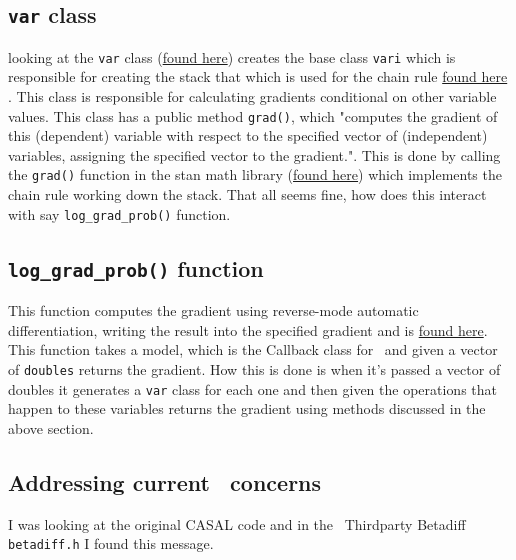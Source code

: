 \subsection{\texttt{var} class}
looking at the \texttt{var} class (\href{https://github.com/stan-dev/math/blob/develop/stan/math/rev/core/var.hpp}{found here}) creates the base class \texttt{vari} which is responsible for creating the stack that which is used for the chain rule \href{https://github.com/stan-dev/math/blob/develop/stan/math/rev/core/vari.hpp}{found here} . This class is responsible for calculating gradients conditional on other variable values. This class has a public method \texttt{grad()}, which "computes the gradient of this (dependent) variable with respect to the specified vector of (independent) variables, assigning the specified vector to the gradient.". This is done by calling the \texttt{grad()} function in the stan math library (\href{https://github.com/stan-dev/math/blob/develop/stan/math/rev/core/grad.hpp}{found here}) which implements the chain rule working down the stack. That all seems fine, how does this interact with say \texttt{log\_grad\_prob()} function.

\subsection{\texttt{log\_grad\_prob()} function}
This function computes the gradient using reverse-mode automatic differentiation, writing the result into the specified gradient and is \href{https://github.com/stan-dev/stan/blob/develop/src/stan/model/log_prob_grad.hpp}{found here}. This function takes a model, which is the Callback class for \CNAME\ and given a vector of \texttt{doubles} returns the gradient. How this is done is when it's passed a vector of doubles it generates a \texttt{var} class for each one and then given the operations that happen to these variables returns the gradient using methods discussed in the above section.


\subsection{Addressing current \CNAME\ concerns}
I was looking at the original CASAL code and in the \CNAME\ Thirdparty Betadiff \texttt{betadiff.h} I found this message.

